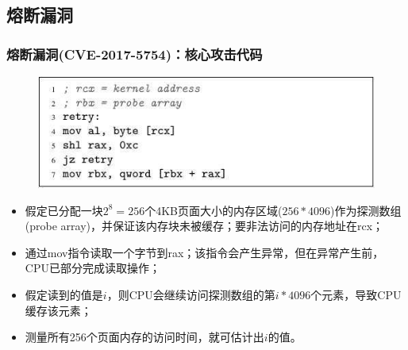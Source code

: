 \subsection{熔断漏洞} %
\begin{frame}
    \frametitle{熔断漏洞(CVE-2017-5754)：核心攻击代码}
	  	\begin{figure}
	  	\includegraphics[width=0.6\linewidth]{figs/meltdown-poc.jpg}
	  	\end{figure} \pause
		    \begin{itemize}
		        \item 假定已分配一块$2^{8}=256$个4KB页面大小的内存区域($256*4096$)作为探测数组(probe array)，并保证该内存块未被缓存；要非法访问的内存地址在rcx； \pause
		        \item 通过mov指令读取一个字节到rax；该指令会产生异常，但在异常产生前，CPU已部分完成读取操作； \pause
		        \item 假定读到的值是$i$，则CPU会继续访问探测数组的第$i*4096$个元素，导致CPU缓存该元素； \pause
		        \item 测量所有256个页面内存的访问时间，就可估计出$i$的值。
		    \end{itemize}
\end{frame}
% 
% 
% 
% 

